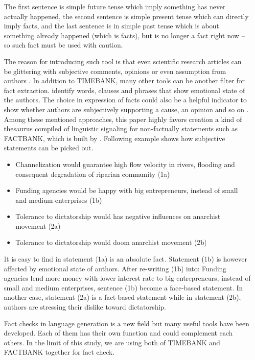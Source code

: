 The first sentence is simple future tense which imply something has never actually happened, the second sentence is simple present tense which can directly imply facts, and the last sentence is in simple past tense which is about something already happened (which is facts), but is no longer a fact right now -- so such fact must be used with caution. 

The reason for introducing such tool is that even scientific research articles can be glittering with subjective comments, opinions or even assumption from authors \cite{schultze2000confessional}. In addition to TIMEBANK, many other tools can be another filter for fact extraction. \cite{Dave2003mining} identify words, clauses and phrases that show emotional state of the authors. The choice in expression of facts could also be a helpful indicator to show whether authors are subjectively supporting a cause, an opinion and so on \cite{Wiebe2005}. Among these mentioned approaches, this paper highly favors creation a kind of thesaurus compiled of linguistic signaling for non-factually statements such as FACTBANK, which is built by \cite{Sauri2009}. Following example shows how subjective statements can be picked out.

\begin{itemize}
	\item Channelization would guarantee high flow velocity in rivers, flooding and consequent degradation of riparian community (1a)
	\item Funding agencies would be happy with big entrepreneurs, instead of small and medium enterprises (1b)
	\item Tolerance to dictatorship would has negative influences on anarchist movement (2a)
	\item Tolerance to dictatorship would doom anarchist movement (2b)
\end{itemize}

It is easy to find in statement (1a) is an absolute fact. Statement (1b) is however affected by emotional state of authors. After re-writing (1b) into: Funding agencies lend more money with lower interest rate to big entrepreneurs, instead of small and medium enterprises, sentence (1b) become a face-based statement. In another case, statement (2a) is a fact-based statement while in statement (2b), authors are stressing their dislike toward dictatorship.

Fact checks in language generation is a new field but many useful tools have been developed. Each of them has their own function and could complement each others. In the limit of this study, we are using both of TIMEBANK and FACTBANK together for fact check.



